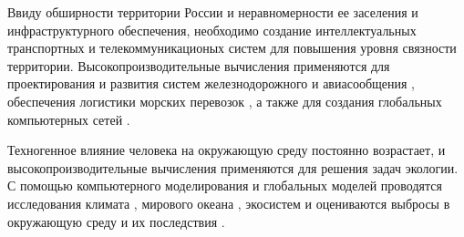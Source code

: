Ввиду обширности территории России и неравномерности ее заселения и инфраструктурного обеспечения, необходимо создание интеллектуальных транспортных и телекоммуникационых систем для повышения уровня связности территории.
Высокопроизводительные вычисления применяются для проектирования и развития систем железнодорожного и авиасообщения \cite{Juntana2022SuperFlight}, обеспечения логистики морских перевозок \cite{Yan2024SuperSea}, а также для создания глобальных компьютерных сетей \cite{Abramov2025SuperNets}.


Техногенное влияние человека на окружающую среду постоянно возрастает, и высокопроизводительные вычисления применяются для решения задач экологии.
С помощью компьютерного моделирования и глобальных моделей проводятся исследования климата \cite{Kulkarni2024SuperClimate}, мирового океана \cite{Wei2024SuperOcean}, экосистем \cite{Rahman2024SuperSpecies} и оцениваются выбросы в окружающую среду и их последствия \cite{Ostromsky2024SuperAir}.

